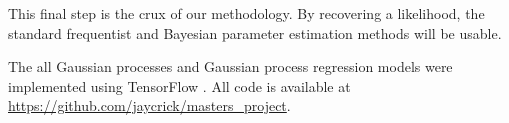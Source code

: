 This final step is the crux of our methodology. By recovering a likelihood,
the standard frequentist and Bayesian parameter estimation methods will
be usable.

The all Gaussian processes and Gaussian process regression models
were implemented using
TensorFlow \parencite{abadi_tensorflow_2015}. All code
is available at \url{https://github.com/jaycrick/masters_project}.